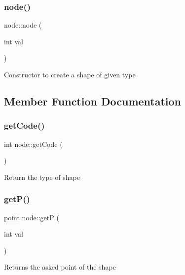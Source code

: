 \subsubsection{\texorpdfstring{node()}{node()}\hspace{0.1cm}{\footnotesize\ttfamily [2/2]}}
{\footnotesize\ttfamily node\+::node (\begin{DoxyParamCaption}\item[{int}]{val }\end{DoxyParamCaption})\hspace{0.3cm}{\ttfamily [inline]}}

Constructor to create a shape of given type 

\subsection{Member Function Documentation}
\mbox{\label{classnode_a220ab653a04346fc295f1386990410f8}} 
\subsubsection{\texorpdfstring{get\+Code()}{getCode()}}
{\footnotesize\ttfamily int node\+::get\+Code (\begin{DoxyParamCaption}{ }\end{DoxyParamCaption})\hspace{0.3cm}{\ttfamily [inline]}}

Return the type of shape \mbox{\label{classnode_a74ad6cbf02b30778e4e2391accfb9e7a}} 
\subsubsection{\texorpdfstring{get\+P()}{getP()}}
{\footnotesize\ttfamily \hyperlink{classpoint}{point} node\+::getP (\begin{DoxyParamCaption}\item[{int}]{val }\end{DoxyParamCaption})\hspace{0.3cm}{\ttfamily [inline]}}

Returns the asked point of the shape \mbox{\label{classnode_a372a737c7109c11192ee2183c038ce8f}} 
